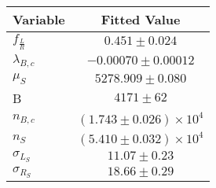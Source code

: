 \begin{tabular}[t]{lc}
\hline
Variable &Fitted Value\\
\hline\hline
$f_{\frac{L}{R}}$&$0.451\pm0.024$\\
\hline
$\lambda_{B,c}$&$-0.00070\pm0.00012$\\
\hline
$\mu_S$&$5278.909\pm0.080$\\
\hline
B&$4171\pm62$\\
\hline
$n_{B,c}$&$(1.743\pm0.026)\times 10^4$\\
\hline
$n_S$&$(5.410\pm0.032)\times 10^4$\\
\hline
$\sigma_{L_S}$&$11.07\pm0.23$\\
\hline
$\sigma_{R_S}$&$18.66\pm0.29$\\
\hline
\end{tabular}